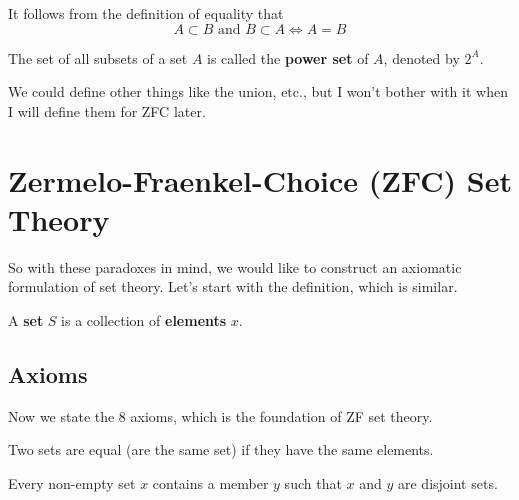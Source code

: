 \documentclass{article}
\begin{document}
    \begin{theorem}[Equality]
      It follows from the definition of equality that 
      \begin{equation}
        A \subset B \text{ and } B \subset A \iff A = B
      \end{equation}
    \end{theorem}

    \begin{definition}
      The set of all subsets of a set $A$ is called the \textbf{power set} of $A$, denoted by $2^A$. 
    \end{definition}

    We could define other things like the union, etc., but I won't bother with it when I will define them for ZFC later.  

\section{Zermelo-Fraenkel-Choice (ZFC) Set Theory} 

  So with these paradoxes in mind, we would like to construct an axiomatic formulation of set theory. Let's start with the definition, which is similar. 

  \begin{definition}[Set]
    A \textbf{set} $S$ is a collection of \textbf{elements} $x$. 
  \end{definition} 

  \subsection{Axioms}

    Now we state the 8 axioms, which is the foundation of ZF set theory. 

    \begin{axiom}
      Two sets are equal (are the same set) if they have the same elements. 
    \end{axiom}

    \begin{axiom}
      Every non-empty set $x$ contains a member $y$ such that $x$ and $y$ are disjoint sets. 
    \end{axiom}

    \begin{axiom}
      
    \end{axiom} 
\end{document}
